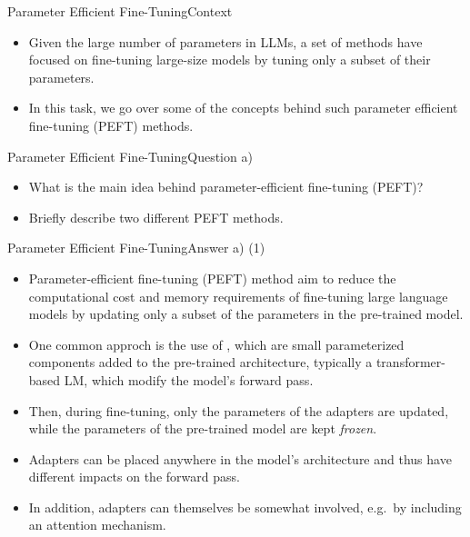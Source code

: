 \documentclass[t]{beamer}
\begin{document}
\begin{frame}{Parameter Efficient Fine-Tuning}{Context}
    \begin{itemize}
        \item Given the large number of parameters in LLMs, a set of methods
              have focused on fine-tuning large-size models by tuning only a
              subset of their parameters.
        \item In this task, we go over some of the concepts behind such
              parameter efficient fine-tuning (PEFT) methods.
    \end{itemize}
\end{frame}

\begin{frame}{Parameter Efficient Fine-Tuning}{Question a)}
    \begin{itemize}
        \item What is the main idea behind parameter-efficient fine-tuning
              (PEFT)?
        \item Briefly describe two different PEFT methods.
    \end{itemize}
\end{frame}

\begin{frame}{Parameter Efficient Fine-Tuning}{Answer a) (1)}
    \begin{itemize}
        \item Parameter-efficient fine-tuning (PEFT) method aim to reduce the
              computational cost and memory requirements of fine-tuning large
              language models by updating only a subset of the parameters in the
              pre-trained model.
        \item One common approch is the use of , which are small
              parameterized components added to the pre-trained architecture,
              typically a transformer-based LM, which modify the model's forward
              pass.
        \item Then, during fine-tuning, only the parameters of the adapters are
              updated, while the parameters of the pre-trained model are kept
              \emph{frozen}.
        \item Adapters can be placed anywhere in the model's architecture and
              thus have different impacts on the forward pass.
        \item In addition, adapters can themselves be somewhat involved, e.g.\
              by including an attention mechanism.
    \end{itemize}
\end{frame}
\end{document}
